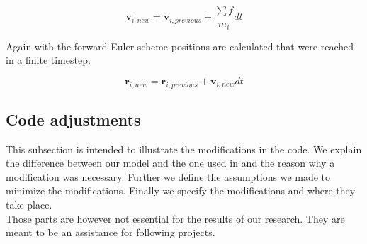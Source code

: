 \documentclass[11pt]{article}
\begin{document}
\begin{equation}
\mathbf{v}_{i,new} = \mathbf{v}_{i,previous} + \frac{\sum {f}}{m_{i}}dt
\end{equation}

Again with the forward Euler scheme positions are calculated that were reached in a finite timestep.

\begin{equation}
\mathbf{r}_{i,new}=\mathbf{r}_{i,previous}+\mathbf{v}_{i,new}dt
\end{equation}

\subsection{Code adjustments}

This subsection is intended to illustrate the modifications in the code. We explain the difference between our model and the one used in \cite{Building} and the reason why a modification was necessary. Further we define the assumptions we made to minimize the modifications. Finally we specify the modifications and where they take place. 
\\
Those parts are however not essential for the results of our research. They are meant to be an assistance for following projects.
\end{document}
